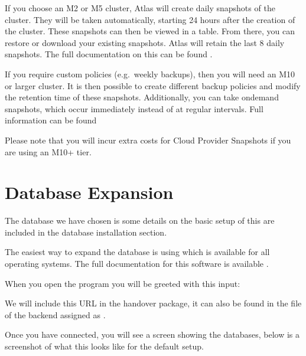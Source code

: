 \documentclass[letterpaper,10pt,english]{sphinxmanual}
\let\sphinxpxdimen\pdfpxdimen\else\newdimen\sphinxpxdimen
\begin{document}
If you choose an M2 or M5 cluster, Atlas will create daily snapshots of
the cluster. They will be taken automatically, starting 24 hours after
the creation of the cluster. These snapshots can then be viewed in a
table. From there, you can restore or download your existing snapshots.
Atlas will retain the last 8 daily snapshots. The full documentation on
this can be found
.

If you require custom policies (e.g. weekly backups), then you will need
an M10 or larger cluster. It is then possible to create different backup
policies and modify the retention time of these snapshots. Additionally,
you can take on\sphinxhyphen{}demand snapshots, which occur immediately instead of at
regular intervals. Full information can be found

Please note that you will incur extra costs for Cloud Provider Snapshots
if you are using an M10+ tier.


\section{Database Expansion}
\label{\detokenize{docs/Expansion/database-expansion:database-expansion}}\label{\detokenize{docs/Expansion/database-expansion::doc}}
The database we have chosen is 
some details on the basic setup of this are included in the database
installation section.

The easiest way to expand the database is using  which is available
for all operating systems. The full documentation for this software is
available .

When you open the program you will be greeted with this input:

\noindent{\hspace*{\fill}\sphinxincludegraphics[width=500\sphinxpxdimen]{{connect}.png}\hspace*{\fill}}

We will include this URL in the handover package, it can also be found
in the  file of the backend assigned as .

Once you have connected, you will see a screen showing the databases,
below is a screenshot of what this looks like for the default setup.
\end{document}
